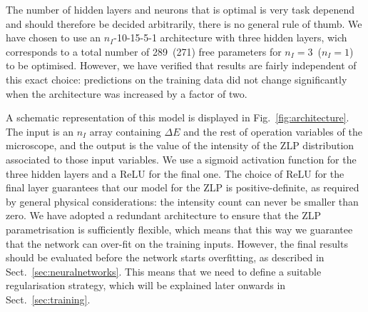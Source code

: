 The number of hidden layers and neurons that is optimal is very task depenend and
should therefore be decided arbitrarily, 
there is no general rule of thumb. 
%
We have chosen to use an $n_I$-10-15-5-1 architecture with three hidden layers, wich corresponds to a total
number of 289~(271) free parameters for $n_I=3$~($n_I=1$) to be optimised.
%
However, we have verified that results are fairly independent of this exact choice:
predictions on the training data did not change significantly when the architecture 
was increased by a factor of two.

A schematic representation of this model
is displayed in Fig.~\ref{fig:architecture}.
%
 The input is an $n_I$ array containing $\Delta E$ and the rest of
 operation variables of the microscope, and
 the output is the value of the intensity of the ZLP distribution
 associated to those input variables.
 We use a sigmoid activation function for the three hidden layers and a ReLU
 for the final one.
 The choice of ReLU for the final layer guarantees that our model for the ZLP
 is positive-definite, as required by general physical considerations: the intensity
 count can never be smaller than zero.
 We have adopted a redundant architecture to ensure that the ZLP parametrisation
 is sufficiently flexible, which means that this way we guarantee that
 the network can over-fit on the training inputs.
 However, the final results should be evaluated before the network starts overfitting,
 as described in Sect.~\ref{sec:neuralnetworks}. 
 This means that we need to define a suitable regularisation strategy, which 
 will be explained later onwards in Sect.~\ref{sec:training}.
  
